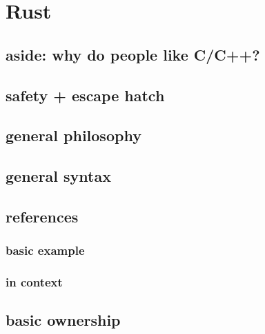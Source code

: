 \graphicspath{{./figures/}}
\title{}
\usepackage[outputdir=latex.out]{minted}
\date{}

\begin{frame}
    \titlepage
\end{frame}



\section{Rust}

\subsection{aside: why do people like C/C++?}


\subsection{safety + escape hatch}




\subsection{general philosophy}


\subsection{general syntax}


\subsection{references}
\subsubsection{basic example}


\subsubsection{in context}


\subsection{basic ownership}


